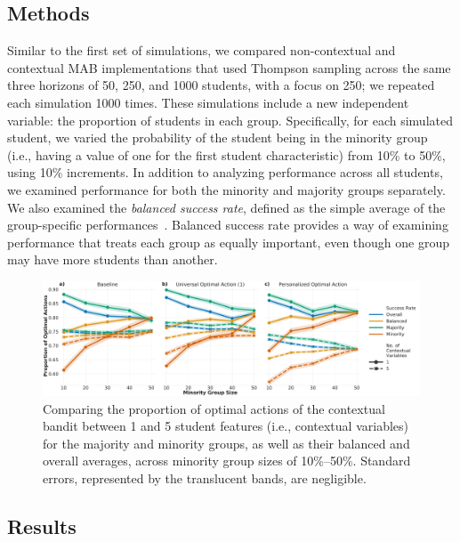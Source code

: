 \subsection{Methods}

Similar to the first set of simulations, we compared non-contextual and contextual MAB implementations that used Thompson sampling across the same three horizons of 50, 250, and 1000 students, with a focus on 250; we repeated each simulation 1000 times. These simulations include a new independent variable: the proportion of students in each group. Specifically, for each simulated student, we varied the probability of the student being in the minority group (i.e., having a value of one for the first student characteristic) from 10\% to 50\%, using 10\% increments. 
In addition to analyzing performance across all students, we examined performance for both the minority and majority groups separately. We also examined the \textit{balanced success rate}, defined as the simple average of the group-specific performances~\cite{ben2010user}. Balanced success rate provides a way of examining performance that treats each group as equally important, even though one group may have more students than another.

\begin{figure}[t]
    \centering
    \includegraphics[width=\textwidth]{figs/MinGrpSize1v5.pdf}
    \caption{Comparing the proportion of optimal actions of the contextual bandit between 1 and 5 student features (i.e., contextual variables) for the majority and minority groups, as well as their balanced and overall averages, across minority group sizes of 10\%--50\%. Standard errors, represented by the translucent bands, are negligible.}
    \label{fig:Balanced_Success_Graph}
\end{figure}
 
\subsection{Results}



